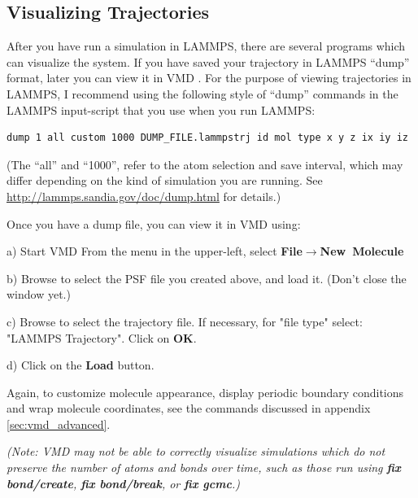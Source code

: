 \documentclass[11pt]{article}
\begin{document}
\subsection{Visualizing Trajectories}
\label{sec:vmd_trajectory}
After you have run a simulation in LAMMPS, there are several programs which
can visualize the system.
If you have saved your trajectory in LAMMPS ``dump'' format,
later you can view it in VMD \cite{VMD}.
For the purpose of viewing trajectories in LAMMPS, 
I recommend using the following style of ``dump'' commands in the LAMMPS 
input-script that you use when you run LAMMPS:
\begin{verbatim}
dump 1 all custom 1000 DUMP_FILE.lammpstrj id mol type x y z ix iy iz
\end{verbatim}
(The ``all'' and ``1000'', refer to the atom selection and save interval, which may differ depending on the kind of simulation you are running.  See \url{http://lammps.sandia.gov/doc/dump.html} for details.)


Once you have a dump file, you can view it in VMD using:
\begin{list}{}
\item a) Start VMD
  From the menu in the upper-left, select 
  \textbf{File}$\rightarrow$\mbox{\textbf{New Molecule}}
\item b) Browse to select the PSF file you created above, and load it.
  (Don't close the window yet.)
\item c) Browse to select the trajectory file.
  If necessary, for "file type" select: "LAMMPS Trajectory".  
  Click on \textbf{OK}.
\item d) Click on the \textbf{Load} button.
\end{list}


Again, to customize molecule appearance,
display periodic boundary conditions and wrap molecule coordinates,
see the commands discussed in appendix \ref{sec:vmd_advanced}.

\textit{(Note: VMD may not be able to correctly visualize simulations which do
not preserve the number of atoms and bonds over time, such as those run using 
\textbf{fix bond/create}, 
\textbf{fix bond/break}, or
\textbf{fix gcmc}.)}

\end{document}
